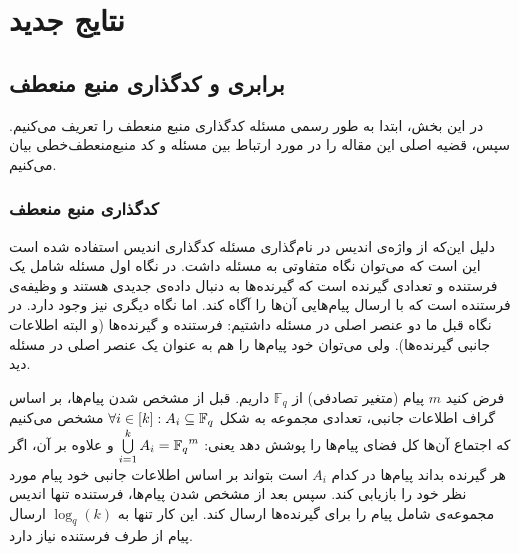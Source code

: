 \section{نتایج جدید}
\label{sec3}
\subsection{
	برابری 
	\picod
	 و کدگذاری منبع منعطف
}
در این بخش، ابتدا به طور رسمی مسئله کدگذاری منبع منعطف را تعریف می‌کنیم. سپس، قضیه اصلی این مقاله را در مورد ارتباط بین مسئله 
\picod
 و کد منبع‌منعطف‌خطی بیان می‌کنیم.
\subsubsection{
		کدگذاری منبع منعطف
}
\begin{recal}
	دلیل این‌که از واژه‌ی اندیس در نام‌گذاری مسئله کدگذاری اندیس استفاده شده است این است که می‌توان نگاه متفاوتی به مسئله داشت. در نگاه اول مسئله شامل یک فرستنده و تعدادی گیرنده است که گیرنده‌ها به دنبال داده‌ی جدیدی هستند و وظیفه‌ی فرستنده است که با ارسال پیام‌هایی آن‌ها را آگاه کند. اما نگاه دیگری نیز وجود دارد. در نگاه قبل ما دو عنصر اصلی در مسئله داشتیم: فرستنده و گیرنده‌ها (و البته اطلاعات جانبی گیرنده‌ها). ولی می‌توان خود پیام‌ها را هم به عنوان یک عنصر اصلی در مسئله دید.
	
فرض کنید 
$m$
پیام (متغیر‌ تصادفی) از
$\mathbb{F}_q$
 داریم. قبل از مشخص شدن پیام‌ها، بر اساس گراف اطلاعات جانبی، تعدادی مجموعه به شکل
 $\forall i \in [k]: A_i \subseteq {\mathbb{F}_q}$
 مشخص می‌کنیم که اجتماع آن‌ها کل فضای پیام‌ها را پوشش دهد یعنی:
 $ \bigcup\limits_{i = 1}^k A_i = {\mathbb{F}_q}^m $
 و علاوه بر آن، اگر هر گیرنده بداند پیام‌ها در کدام
 $A_i$
 است بتواند بر اساس اطلاعات جانبی خود پیام مورد نظر خود را بازیابی کند. سپس بعد از مشخص شدن پیام‌ها، فرستنده تنها اندیس مجموعه‌ی شامل پیام را برای گیرنده‌ها ارسال کند. این کار تنها به
 $\log_q(k)$
 ارسال پیام از طرف فرستنده نیاز دارد.
\end{recal}
